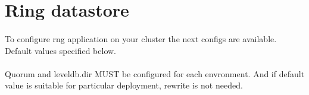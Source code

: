 \section*{Ring datastore}

\paragraph{}
To configure rng application on your cluster the next configs are available. Default values specified below.

\paragraph{}
Quorum and leveldb.dir MUST be configured for each envronment.
And if default value is suitable for particular deployment, rewrite is not needed.

